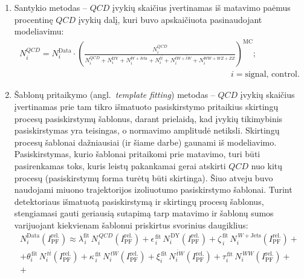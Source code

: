 \documentclass[a4paper, 12pt, oneside]{article}
\newcommand{\WZ}{W\! Z}
\newcommand{\tbarW}{\bar{t}W}
\newcommand{\ttbar}{t\bar{t}}
\newcommand{\WJets}{W\! +\!\mathrm{Jets}}
\newcommand{\QCD}{QC\! D}
\newlength\q
\begin{document}
\begin{enumerate}
	\item Santykio metodas -- $\QCD$ įvykių skaičius įvertinamas iš matavimo paėmus procentinę $\QCD$ įvykių dalį, kuri buvo apskaičiuota
	pasinaudojant modeliavimu:
	\begin{equation}
		\begin{gathered}
			N^{\QCD}_{i} = N^{\mathrm{Data}}_{i} \cdot \left(\frac{N^{\QCD}_{i}}
			{N^{\QCD}_{i} + N^{\mathrm{DY}}_{i} + N^{\WJets}_{i} +
			N^{\ttbar}_{i} + N^{tW+\tbarW}_{i} + N^{WW+\WZ+ZZ}_{i}} \right)^{\mathrm{MC}}; \\
			\hspace{300pt} i = \mathrm{signal}, \, \mathrm{control}.
		\end{gathered}
	\end{equation}
	\item Šablonų pritaikymo (angl.\ \textit{template fitting}) metodas -- $\QCD$ įvykių skaičius įvertinamas prie tam tikro
	išmatuoto pasiskirstymo pritaikius skirtingų procesų pasiskirstymų šablonus, darant prielaidą, kad įvykių tikimybinis
	pasiskirstymas yra teisingas, o normavimo amplitudė netiksli.
	Skirtingų procesų šablonai dažniausiai (ir šiame darbe) gaunami iš modeliavimo.
	Pasiskirstymas, kurio šablonai pritaikomi prie matavimo, turi būti pasirenkamas toks, kuris leistų pakankamai gerai
	atskirti $\QCD$ nuo kitų procesų (pasiskirstymų forma turėtų būti skirtinga).
	Šiuo atveju buvo naudojami miuono trajektorijos izoliuotumo pasiskirstymo šablonai.
	Turint detektoriaus išmatuotą pasiskirstymą ir skirtingų procesų šablonus, stengiamasi gauti geriausią sutapimą tarp matavimo ir
	šablonų sumos varijuojant kiekvienam šablonui priskirtus svorinius daugiklius:
	\begin{equation}
		\begin{gathered}
			N^{\mathrm{Data}}_{i}(I^{\mathrm{rel.}}_{\mathrm{PF}}) \approx
			\lambda^{\mathrm{fit}}_{\,i}\, N^{\,\QCD}_{i}(I^{\mathrm{rel.}}_{\mathrm{PF}}) +
			\epsilon^{\,\mathrm{fit}}_{\,i}\, N^{\,\mathrm{DY}}_{i}(I^{\mathrm{rel.}}_{\mathrm{PF}}) +
			\zeta^{\,\mathrm{fit}}_{\,i}\, N^{\,\WJets}_{i}(I^{\mathrm{rel.}}_{\mathrm{PF}}) + \\[7pt] +
			\theta^{\,\mathrm{fit}}_{i}\, N^{\,\ttbar}_{i}(I^{\mathrm{rel.}}_{\mathrm{PF}}) +
			\kappa^{\,\mathrm{fit}}_{\,i}\, N^{\,tW}_{i}(I^{\mathrm{rel.}}_{\mathrm{PF}}) + 
			\xi^{\,\mathrm{fit}}_{i}\, N^{\,\tbarW}_{i}(I^{\mathrm{rel.}}_{\mathrm{PF}}) +
			\tau^{\,\mathrm{fit}}_{i}\, N^{\,WW}_{i}(I^{\mathrm{rel.}}_{\mathrm{PF}}) + \\[7pt] +

\end{gathered}
\end{equation}
\end{enumerate}
\end{document}
